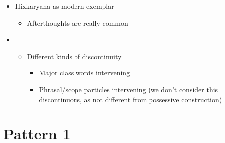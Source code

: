\documentclass[10pt]{article}
\begin{document}
\begin{itemize}
\item
  Hixkaryana as modern exemplar

  \begin{itemize}
  \tightlist
  \item
    Afterthoughts are really common
  \end{itemize}
\item

  \begin{itemize}
  \tightlist
  \item
    Different kinds of discontinuity

    \begin{itemize}
    \tightlist
    \item
      Major class words intervening
    \item
      Phrasal/scope particles intervening (we don't consider this
      discontinuous, as not different from possessive construction)
    \end{itemize}
  \end{itemize}
\end{itemize}

\section{Pattern 1}
\end{document}
